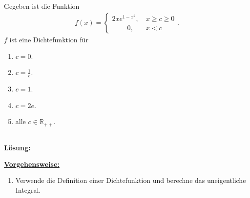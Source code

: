 \subsection*{}
Gegeben ist die Funktion
\begin{align*}
	f(x) =
	\begin{cases}
		2 x  e^{1 - x^2}, \ &x \geq c  \geq 0\\
		\qquad	\ 0 , \ &x < c
	\end{cases}.
\end{align*}
$ f $ ist eine Dichtefunktion für
\renewcommand{\labelenumi}{(\alph{enumi})}
\begin{enumerate}
	\item 
	$ c = 0 $.
	\item 
	$ c = \frac{1}{e} $.
	\item 
	$ c= 1 $.
	\item 
	$ c = 2e $.
	\item
	alle $ c \in \mathbb{R}_{++} $.
\end{enumerate}
\ \\
\textbf{Lösung:}
\begin{mdframed}
\underline{\textbf{Vorgehensweise:}}
\renewcommand{\labelenumi}{\theenumi.}
\begin{enumerate}
\item Verwende die Definition einer Dichtefunktion und berechne das uneigentliche Integral.
\end{enumerate}
\end{mdframed}

